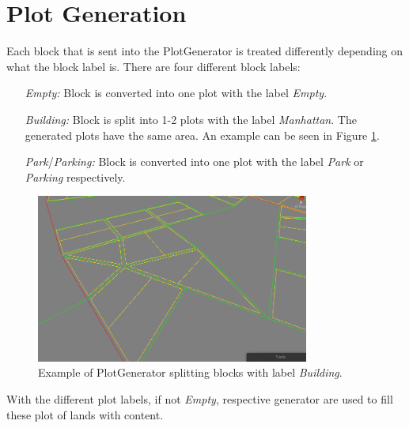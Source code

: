 \section{Plot Generation}
Each block that is sent into the PlotGenerator is treated differently depending on what the block label is. 
There are four different block labels: 

\begin{itemize}
    \item[\textit{Empty: }] Block is converted into one plot with the label \textit{Empty}.
    \item[\textit{Building: }] Block is split into 1-2 plots with the label \textit{Manhattan}. The generated plots have the same area. An example can be seen in Figure \ref{fig:plot_split}. %
    \item[\textit{Park}/\textit{Parking: }] Block is converted into one plot with the label \textit{Park} or \textit{Parking} respectively.  
\end{itemize}

\begin{figure}[h!]
    \centering
  
    \includegraphics[width=0.8\textwidth]{figure/PlotSplit.png}
    \caption{Example of PlotGenerator splitting blocks with label \textit{Building}.}
  
    \label{fig:plot_split}
  \end{figure}
  
With the different plot labels, if not \textit{Empty}, respective generator are used to fill these plot of lands with content. 
